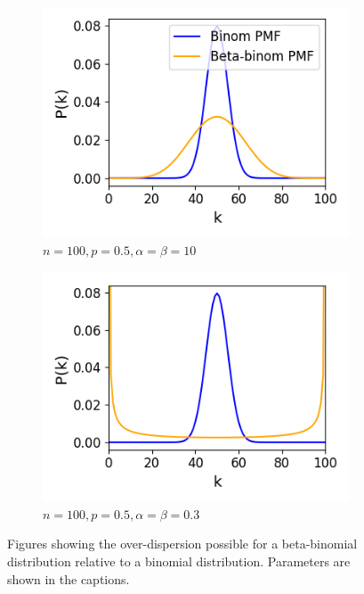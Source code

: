       \begin{figure}[h]
        \begin{subfigure}[h]{0.5\linewidth}
          \includegraphics[width=\textwidth]{figures/conway_maxwell/betabinomial_overdispersion.png}
          \caption{$n=100, p=0.5, \alpha=\beta=10$}
          \label{fig:betabinomial_overdispersion}
        \end{subfigure}
        \begin{subfigure}[h]{0.5\linewidth}
          \includegraphics[width=\textwidth]{figures/conway_maxwell/betabinomial_big_overdispersion.png}
          \caption{$n=100, p=0.5, \alpha=\beta=0.3$}
          \label{fig:betabinomial_big_overdispersion}
        \end{subfigure}
        \caption{Figures showing the over-dispersion possible for a beta-binomial distribution relative to a binomial distribution. Parameters are shown in the captions. }
      \end{figure}


